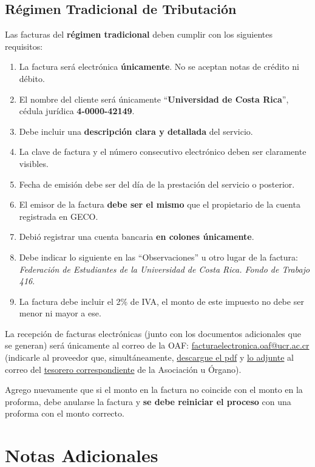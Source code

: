\documentclass[12pt]{article}
\begin{document}
\subsection{Régimen Tradicional de Tributación}

Las facturas del \textbf{régimen tradicional} deben cumplir con los siguientes requisitos: 

\begin{enumerate}
    \item La factura será electrónica \textbf{únicamente}. No se aceptan notas de crédito ni débito.
    \item El nombre del cliente será únicamente “\textbf{Universidad de Costa Rica}”, cédula jurídica
\textbf{4-0000-42149}.
    \item Debe incluir una \textbf{descripción clara y detallada} del servicio.
    \item La clave de factura y el número consecutivo electrónico deben ser claramente visibles.
    \item Fecha de emisión debe ser del día de la prestación del servicio o posterior.
    \item El emisor de la factura \textbf{debe ser el mismo} que el propietario de la cuenta registrada en GECO.
    \item Debió registrar una cuenta bancaria \textbf{en colones únicamente}.
    \item Debe indicar lo siguiente en las “Observaciones” u otro lugar de la factura:
\emph{Federación de Estudiantes de la Universidad de Costa Rica. Fondo de Trabajo 416}.
    \item La factura debe incluir el 2\% de IVA, el monto de este impuesto no debe ser menor ni mayor a ese.
\end{enumerate}

La recepción de facturas electrónicas (junto con los documentos adicionales que se generan) será únicamente al correo de la OAF: \textcolor{blue}{\href{mailto:facturaelectronica.oaf@ucr.ac.cr}{facturaelectronica.oaf@ucr.ac.cr}} (indicarle al proveedor
que, simultáneamente, \underline{descargue el pdf} y \underline{lo adjunte} al correo del \underline{tesorero correspondiente} de la Asociación u Órgano).\par

Agrego nuevamente que si el monto en la factura no coincide con el monto en la proforma, debe anularse la factura y \textbf{se debe reiniciar el proceso} con una proforma con el monto correcto.

\section{Notas Adicionales}
\end{document}
